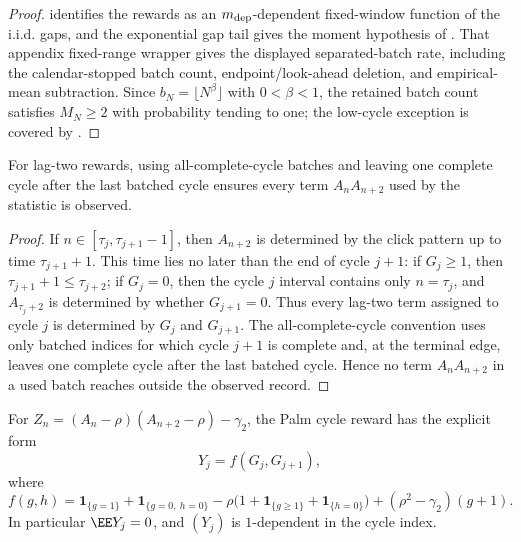 \begin{proof}
 identifies the
rewards as an \(m_{\rm dep}\)-dependent fixed-window function of the i.i.d.
gaps, and the exponential gap tail gives the moment hypothesis of
.  That appendix
fixed-range wrapper gives the displayed separated-batch rate, including the
calendar-stopped batch count,
endpoint/look-ahead deletion, and empirical-mean subtraction.  Since
\(b_N=\lfloor N^\beta\rfloor\) with \(0<\beta<1\), the retained batch count
satisfies \(M_N\ge2\) with probability tending to one; the low-cycle
exception is covered by .
\end{proof}

\begin{lemma}\label{lem:all-cycle-lag-two-windows-main}
For lag-two rewards, using all-complete-cycle batches and leaving one complete
cycle after the last batched cycle ensures every term \(A_nA_{n+2}\) used by
the statistic is observed.
\end{lemma}

\begin{proof}
If \(n\in[\tau_j,\tau_{j+1}-1]\), then \(A_{n+2}\) is determined by the
click pattern up to time \(\tau_{j+1}+1\).  This time lies no later than the
end of cycle \(j+1\): if \(G_j\ge1\), then \(\tau_{j+1}+1\le\tau_{j+2}\);
if \(G_j=0\), then the cycle \(j\) interval contains only \(n=\tau_j\), and
\(A_{\tau_j+2}\) is determined by whether \(G_{j+1}=0\).  Thus every lag-two
term assigned to cycle \(j\) is determined by \(G_j\) and \(G_{j+1}\).  The
all-complete-cycle convention uses only batched indices for which cycle
\(j+1\) is complete and, at the terminal edge, leaves one complete cycle after
the last batched cycle.  Hence no term \(A_nA_{n+2}\) in a used batch reaches
outside the observed record.
\end{proof}

\begin{lemma}\label{lem:lag-two-reward-main}
For \(Z_n=(A_n-\rho)(A_{n+2}-\rho)-\gamma_2\), the Palm cycle reward has the
explicit form
\begin{equation}\label{eq:lag-two-cycle-reward-main}
Y_j=f(G_j,G_{j+1}),
\end{equation}
where
\[
f(g,h)=
\mathbf1_{\{g=1\}}+\mathbf1_{\{g=0,\ h=0\}}
-\rho\bigl(1+\mathbf1_{\{g\ge1\}}+\mathbf1_{\{h=0\}}\bigr)
+(\rho^2-\gamma_2)(g+1).
\]
In particular \(\EE Y_j=0\), and \((Y_j)\) is \(1\)-dependent in the cycle
index.
\end{lemma}

